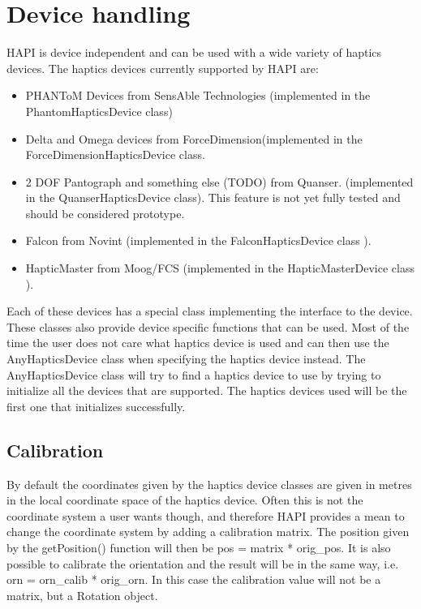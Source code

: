 
\chapter {Device handling}
HAPI is device independent and can be used with a wide variety of haptics devices. The haptics devices currently supported by HAPI are:

\begin{itemize}
\item PHANToM Devices from SensAble Technologies (implemented in the
  PhantomHapticsDevice class) \cite{sensable}
\item Delta and Omega devices from ForceDimension(implemented in the
  ForceDimensionHapticsDevice class. \cite{forcedimension} 
\item 2 DOF Pantograph and something else (TODO) from Quanser.
 (implemented in the QuanserHapticsDevice class). This feature is not yet fully
 tested and should be considered prototype. \cite{quanser}
\item Falcon from Novint (implemented in the FalconHapticsDevice class ). \cite{novint} 
\item HapticMaster from Moog/FCS (implemented in the HapticMasterDevice class ).\cite{moogfcs} \cite{linde02hapticmaster} 
\end{itemize}

Each of these devices has a special class implementing the interface to the device. These classes also provide device specific functions that can be used. Most of the time the user does not care what haptics device is used and can then use the AnyHapticsDevice class when specifying the haptics device instead. The AnyHapticsDevice class will try to find a haptics device to use by trying to initialize all the devices that are supported. The haptics devices used will be the first one that initializes successfully.

\section{Calibration}
By default the coordinates given by the haptics device classes are
given in metres in the local coordinate space of the haptics
device. Often this is not the coordinate system a user wants
though, and therefore HAPI provides a mean to change the coordinate
system by adding a calibration matrix. The position given by the
getPosition() function will then be pos = matrix * orig\_pos. It is
also possible to calibrate the orientation and the result will be in
the same way, i.e. orn = orn\_calib * orig\_orn. In this case the
calibration value will not be a matrix, but a Rotation object.


